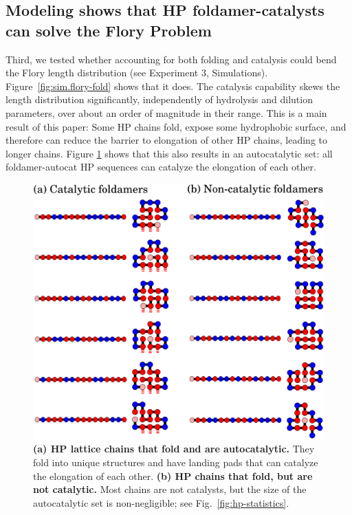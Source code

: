 \documentclass[journal=jacsat,manuscript=article,layout=twocolumn]{achemso}
\begin{document}
\subsection{Modeling shows that HP foldamer-catalysts can solve the Flory Problem}

Third, we tested whether accounting for both folding and catalysis could bend the Flory length 
distribution (see Experiment 3, Simulations).  Figure~\ref{fig:sim.flory-fold} shows that it does. 
 The 
catalysis capability skews the length distribution significantly, independently of hydrolysis and 
dilution parameters, over about an order of magnitude in their range.  This is a main result of this 
paper:  Some HP chains fold, expose some hydrophobic surface, and therefore can reduce the barrier 
to elongation of other HP chains, leading to longer chains.  Figure \ref{fig:fold-cat} shows that 
this also results in an autocatalytic set: all foldamer-autocat HP sequences can catalyze the 
elongation of each other.

\begin{figure}[htb!]
  \centering
  \includegraphics[width=\columnwidth]{pictures/fold-cat.pdf} 
  \caption{\footnotesize{\textbf{(a) HP lattice chains that fold and are autocatalytic.}  They fold 
into unique structures and have landing pads that can catalyze the elongation of each other.  
\textbf{(b) HP chains that fold, but are not catalytic.}  Most chains are not catalysts, but the 
size of 
the autocatalytic set is non-negligible; see Fig.~\ref{fig:hp-statistics}.}}
  \label{fig:fold-cat}
\end{figure}
\end{document}
